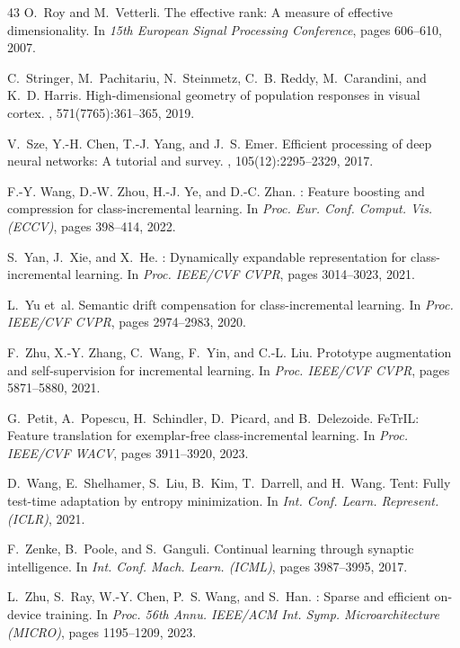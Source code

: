 \documentclass{article}
\begin{document}
\begin{thebibliography}{43}
O.~Roy and M.~Vetterli.
\newblock The effective rank: A measure of effective dimensionality.
\newblock In {\em 15th European Signal Processing Conference}, pages 606--610, 2007.

C.~Stringer, M.~Pachitariu, N.~Steinmetz, C.~B. Reddy, M.~Carandini, and K.~D. Harris.
\newblock High-dimensional geometry of population responses in visual cortex.
, 571(7765):361--365, 2019.

V.~Sze, Y.-H. Chen, T.-J. Yang, and J.~S. Emer.
\newblock Efficient processing of deep neural networks: A tutorial and survey.
, 105(12):2295--2329, 2017.

F.-Y. Wang, D.-W. Zhou, H.-J. Ye, and D.-C. Zhan.
: Feature boosting and compression for class-incremental learning.
\newblock In {\em Proc. Eur. Conf. Comput. Vis. (ECCV)}, pages 398--414, 2022.

S.~Yan, J.~Xie, and X.~He.
: Dynamically expandable representation for class-incremental learning.
\newblock In {\em Proc. IEEE/CVF CVPR}, pages 3014--3023, 2021.

L.~Yu et~al.
\newblock Semantic drift compensation for class-incremental learning.
\newblock In {\em Proc. IEEE/CVF CVPR}, pages 2974--2983, 2020.

F.~Zhu, X.-Y. Zhang, C.~Wang, F.~Yin, and C.-L. Liu.
\newblock Prototype augmentation and self-supervision for incremental learning.
\newblock In {\em Proc. IEEE/CVF CVPR}, pages 5871--5880, 2021.

G.~Petit, A.~Popescu, H.~Schindler, D.~Picard, and B.~Delezoide.
\newblock Fe{T}r{IL}: Feature translation for exemplar-free class-incremental learning.
\newblock In {\em Proc. IEEE/CVF WACV}, pages 3911--3920, 2023.

D.~Wang, E.~Shelhamer, S.~Liu, B.~Kim, T.~Darrell, and H.~Wang.
\newblock Tent: Fully test-time adaptation by entropy minimization.
\newblock In {\em Int. Conf. Learn. Represent. (ICLR)}, 2021.

F.~Zenke, B.~Poole, and S.~Ganguli.
\newblock Continual learning through synaptic intelligence.
\newblock In {\em Int. Conf. Mach. Learn. (ICML)}, pages 3987--3995, 2017.

L.~Zhu, S.~Ray, W.-Y. Chen, P.~S. Wang, and S.~Han.
: Sparse and efficient on-device training.
\newblock In {\em Proc. 56th Annu. IEEE/ACM Int. Symp. Microarchitecture (MICRO)}, pages 1195--1209, 2023.

\end{thebibliography}
\end{document}
